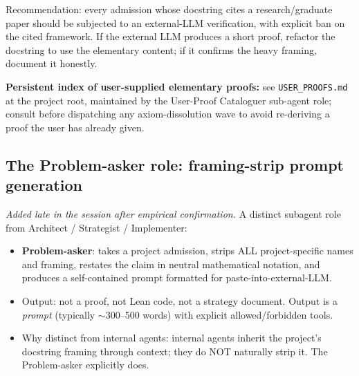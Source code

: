 \documentclass[11pt,a4paper]{article}
\theoremstyle{plain}
\theoremstyle{definition}
\begin{document}
Recommendation: every admission whose docstring cites a
research/graduate paper should be subjected to an external-LLM
verification, with explicit ban on the cited framework. If the
external LLM produces a short proof, refactor the docstring to use
the elementary content; if it confirms the heavy framing, document it
honestly.

\textbf{Persistent index of user-supplied elementary proofs:}
see \texttt{USER\_PROOFS.md} at the project root, maintained by the
User-Proof Cataloguer sub-agent role; consult before dispatching any
axiom-dissolution wave to avoid re-deriving a proof the user has
already given.

\subsection{The Problem-asker role: framing-strip prompt generation}\label{sec:problem-asker}

\emph{Added late in the session after empirical confirmation.} A
distinct subagent role from Architect / Strategist / Implementer:

\begin{itemize}[leftmargin=1.5em]
\item \textbf{Problem-asker}: takes a project admission, strips ALL
      project-specific names and framing, restates the claim in
      neutral mathematical notation, and produces a self-contained
      prompt formatted for paste-into-external-LLM.
\item Output: not a proof, not Lean code, not a strategy document.
      Output is a \emph{prompt} (typically $\sim$300--500 words) with
      explicit allowed/forbidden tools.
\item Why distinct from internal agents: internal agents inherit the
      project's docstring framing through context; they do NOT
      naturally strip it. The Problem-asker explicitly does.
\end{itemize}
\end{document}
